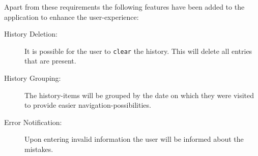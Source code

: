 Apart from these requirements the following features have been added to the application to enhance the user-experience:

\begin{description}
\item[History Deletion:] It is possible for the user to \texttt{clear} the history. This will delete all entries that are present.
\item[History Grouping:] The history-items will be grouped by the date on which they were visited to provide easier navigation-possibilities.
\item[Error Notification:] Upon entering invalid information the user will be informed about the mistakes.
\end{description}